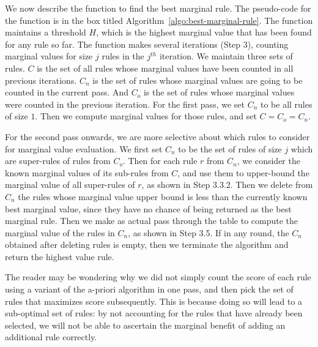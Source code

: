 We now describe the function to find the best marginal rule. The pseudo-code for the function is in the box titled Algorithm~\ref{algo:best-marginal-rule}. The function maintains a threshold $H$, which is the highest marginal value that has been found for any rule so far. The function makes several iterations (Step $3$), counting marginal values for size $j$ rules in the $j^{th}$ iteration. We maintain three sets of rules. $C$ is the set of all rules whose marginal values have been counted in all previous iterations. $C_n$ is the set of rules whose marginal values are going to be counted in the current pass. And $C_o$ is the set of rules whose marginal values were counted in the previous iteration. For the first pass, we set $C_n$ to be all rules of size $1$. Then we compute marginal values for those rules, and set $C = C_o = C_n$.

For the second pass onwards, we are more selective about which rules to consider for marginal value evaluation. We first set $C_n$ to be the set of rules of size $j$ which are super-rules of rules from $C_o$. Then for each rule $r$ from $C_n$, we consider the known marginal values of its sub-rules from $C$, and use them to upper-bound the marginal value of all super-rules of $r$, as shown in Step 3.3.2. Then we delete from $C_n$ the rules whose marginal value upper bound is less than the currently known best marginal value, since they have no chance of being returned as the best marginal rule. Then we make as actual pass through the table to compute the marginal value of the rules in $C_n$, as shown in Step 3.5. If in any round, the $C_n$ obtained after deleting rules is empty, then we terminate the algorithm and return the highest value rule. 

The reader may be wondering why we did not simply count the score of each rule using a variant of the a-priori algorithm in one pass, and then pick the set of rules that maximizes score subsequently. This is because doing so will lead to a sub-optimal set of rules: by not accounting for the rules that have already been selected, we will not be able to ascertain the marginal benefit of adding an additional rule correctly.

